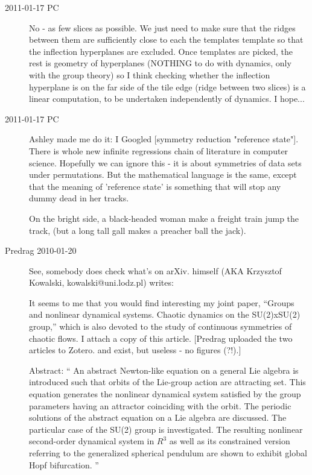 \begin{description}
\item[2011-01-17 PC]  No - as few slices as possible. We just need
to make sure that the ridges between them are sufficiently close
to each the templates template so that the inflection hyperplanes
are excluded. Once templates are picked, the rest is geometry of
hyperplanes (NOTHING to do with dynamics, only with the group theory)
so I think checking whether the inflection hyperplane is on
the far side of the tile edge (ridge between two slices)
is a linear computation, to be undertaken independently of dynamics. I hope...


\item[2011-01-17 PC] Ashley made me do it: I Googled [symmetry reduction
"reference state"]. There is whole new infinite regressions chain of
literature in computer science. Hopefully we can ignore
this - it is about symmetries of data sets under permutations. But the
mathematical language is the same, except that the meaning of 'reference
state' is something that will stop any dummy dead in her tracks.

On the bright side,
a black-headed woman make a freight train
{jump the track},
(but a long tall gall makes a preacher ball the jack).


  \item[Predrag 2010-01-20] See, somebody does check what's on arXiv.
himself (AKA Krzysztof Kowalski, kowalski@uni.lodz.pl)
writes:

It seems to me
that you would find interesting my joint paper,
``Groups and nonlinear
dynamical systems. Chaotic dynamics on the SU(2)xSU(2) group,''
which is also devoted to the study of continuous symmetries
of chaotic flows.  I attach a copy of this article.
[Predrag uploaded the two articles to Zotero.
 and
 exist,
but useless - no figures (?!).]

Abstract: ``
An abstract Newton-like equation on a general Lie algebra is introduced such that orbits of the Lie-group action are attracting set. This equation generates the nonlinear dynamical system satisfied by the group parameters having an attractor coinciding with the orbit. The periodic solutions of the abstract equation on a Lie algebra are discussed. The particular case of the SU(2) group is investigated. The resulting nonlinear second-order dynamical system in $R^3$ as well as its constrained version referring to the generalized spherical pendulum are shown to exhibit global Hopf bifurcation.
''


\end{description}
